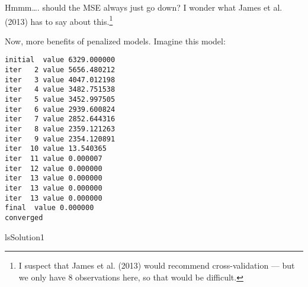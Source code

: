 \documentclass[10pt,]{article}
\newenvironment{Shaded}{\begin{snugshade}}{\end{snugshade}}
\newcommand{\KeywordTok}[1]{\textcolor[rgb]{0.13,0.29,0.53}{\textbf{{#1}}}}
\newcommand{\DataTypeTok}[1]{\textcolor[rgb]{0.13,0.29,0.53}{{#1}}}
\newcommand{\DecValTok}[1]{\textcolor[rgb]{0.00,0.00,0.81}{{#1}}}
\newcommand{\StringTok}[1]{\textcolor[rgb]{0.31,0.60,0.02}{{#1}}}
\newcommand{\NormalTok}[1]{{#1}}
\let\rmarkdownfootnote\footnote%
\def\footnote{\protect\rmarkdownfootnote}
\begin{document}
Hmmm\ldots{}. should the MSE always just go down? I wonder what James et
al. (2013) has to say about this.\footnote{I suspect that James et al.
  (2013) would recommend cross-validation --- but we only have 8
  observations here, so that would be difficult.}

Now, more benefits of penalized models. Imagine this model:

\begin{Shaded}
\end{Shaded}

\begin{verbatim}
initial  value 6329.000000 
iter   2 value 5656.480212
iter   3 value 4047.012198
iter   4 value 3482.751538
iter   5 value 3452.997505
iter   6 value 2939.600824
iter   7 value 2852.644316
iter   8 value 2359.121263
iter   9 value 2354.120891
iter  10 value 13.540365
iter  11 value 0.000007
iter  12 value 0.000000
iter  13 value 0.000000
iter  13 value 0.000000
iter  13 value 0.000000
final  value 0.000000 
converged
\end{verbatim}

\begin{Shaded}
\begin{Highlighting}[]
\NormalTok{lsSolution1}
\end{Highlighting}
\end{Shaded}
\end{document}
